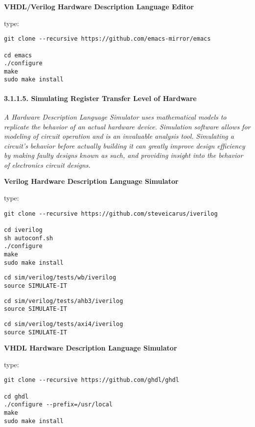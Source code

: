 \documentclass[]{article}
\let\oldparagraph\paragraph
\renewcommand{\paragraph}[1]{\oldparagraph{#1}\mbox{}}
\begin{document}
\textbf{VHDL/Verilog Hardware Description Language Editor}

type:

\begin{verbatim}
git clone --recursive https://github.com/emacs-mirror/emacs

cd emacs
./configure
make
sudo make install
\end{verbatim}

\hypertarget{simulating-register-transfer-level-of-hardware}{%
\paragraph{3.1.1.5. Simulating Register Transfer Level of
Hardware}\label{simulating-register-transfer-level-of-hardware}}

\emph{A Hardware Description Language Simulator uses mathematical models
to replicate the behavior of an actual hardware device. Simulation
software allows for modeling of circuit operation and is an invaluable
analysis tool. Simulating a circuit's behavior before actually building
it can greatly improve design efficiency by making faulty designs known
as such, and providing insight into the behavior of electronics circuit
designs.}

\textbf{Verilog Hardware Description Language Simulator}

type:

\begin{verbatim}
git clone --recursive https://github.com/steveicarus/iverilog

cd iverilog
sh autoconf.sh
./configure
make
sudo make install
\end{verbatim}

\begin{verbatim}
cd sim/verilog/tests/wb/iverilog
source SIMULATE-IT
\end{verbatim}

\begin{verbatim}
cd sim/verilog/tests/ahb3/iverilog
source SIMULATE-IT
\end{verbatim}

\begin{verbatim}
cd sim/verilog/tests/axi4/iverilog
source SIMULATE-IT
\end{verbatim}

\textbf{VHDL Hardware Description Language Simulator}

type:

\begin{verbatim}
git clone --recursive https://github.com/ghdl/ghdl

cd ghdl
./configure --prefix=/usr/local
make
sudo make install
\end{verbatim}
\end{document}
